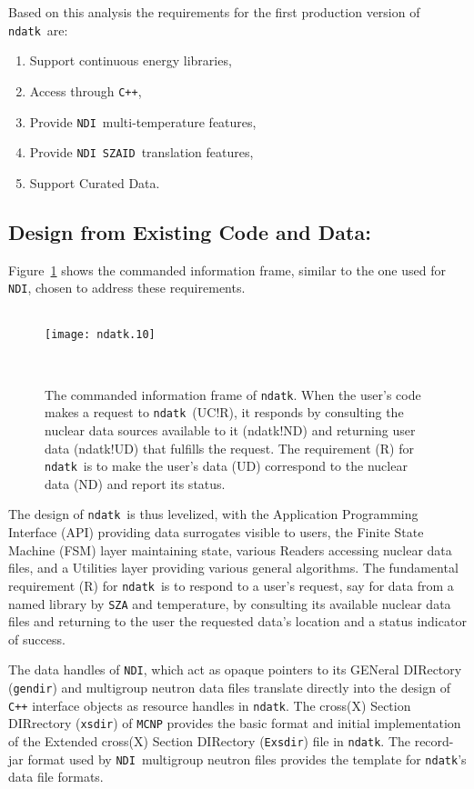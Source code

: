 \documentclass[12pt]{lamemo}
\newcommand{\ndatk}{\texttt{ndatk}}
\newcommand{\NDI}{\texttt{NDI}}
\newcommand{\zaid}{\texttt{SZAID}}
\begin{document}
Based on this analysis the requirements for the first production
version of \ndatk\ are:
\begin{enumerate}
\item Support continuous energy libraries,
\item Access through \texttt{C++},
\item Provide \NDI\ multi-temperature features,
\item Provide \NDI\ \zaid\ translation features,
\item Support Curated Data.
\end{enumerate}


\subsection{\hspace{-1.5em}Design from Existing Code and Data: }
Figure~\ref{fig:frame} shows the commanded information frame, similar
to the one used for \NDI, chosen to address these requirements.
\begin{figure}\centering
\hrulefill \\
\texttt{[image: ndatk.10]}
\caption{The commanded information frame\cite[p. 215]{jackson01} of
  \ndatk.  When the user's code makes a request to \ndatk\ (UC!R), it
  responds by consulting the nuclear data sources available to it
  (ndatk!ND) and returning user data (ndatk!UD) that fulfills the
  request.  The requirement (R) for \ndatk\ is to make the user's data
  (UD) correspond to the nuclear data (ND) and report its
  status.} \label{fig:frame} \hrulefill\\
\end{figure}
The design of \ndatk\ is thus levelized, with the Application
Programming Interface (API) providing data surrogates visible to
users, the Finite State Machine (FSM) layer maintaining state, various
Readers accessing nuclear data files, and a Utilities layer providing
various general algorithms.  The fundamental requirement (R) for
\ndatk\ is to respond to a user's request, say for data from a named
library by \texttt{SZA} and temperature, by consulting its available
nuclear data files and returning to the user the requested data's
location and a status indicator of success.

The data handles\cite{gray04} of \NDI, which act as opaque pointers to
its GENeral DIRectory (\texttt{gendir}) and multigroup neutron data
files translate directly into the design of \texttt{C++} interface
objects as resource handles in \ndatk.  The cross(X) Section
DIRrectory\cite[Appendix F]{briesmeister00} (\texttt{xsdir}) of
\texttt{MCNP}\cite{briesmeister00} provides the basic format and
initial implementation of the Extended cross(X) Section DIRectory
(\texttt{Exsdir}) file in \ndatk.  The record-jar
format\cite[p. 116]{raymond04} used by \NDI\ multigroup neutron
files\cite{campbell98a} provides the template for \ndatk's data file
formats.
\end{document}
